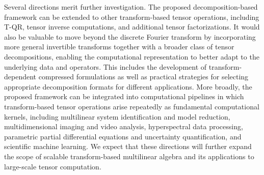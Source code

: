 \documentclass[onefignum,onetabnum]{siamart250211}
\begin{document}
Several directions merit further investigation. The proposed decomposition-based framework can be extended to other transform-based tensor operations, including T-QR, tensor inverse computations, and additional tensor factorizations. It would also be valuable to move beyond the discrete Fourier transform by incorporating more general invertible transforms together with a broader class of tensor decompositions, enabling the computational representation to better adapt to the underlying data and operators. This includes the development of transform-dependent compressed formulations as well as practical strategies for selecting appropriate decomposition formats for different applications. More broadly, the proposed framework can be integrated into computational pipelines in which transform-based tensor operations arise repeatedly as fundamental computational kernels, including multilinear system identification and model reduction, multidimensional imaging and video analysis, hyperspectral data processing, parametric partial differential equations and uncertainty quantification, and scientific machine learning. We expect that these directions will further expand the scope of scalable transform-based multilinear algebra and its applications to large-scale tensor computation.


\end{document}
